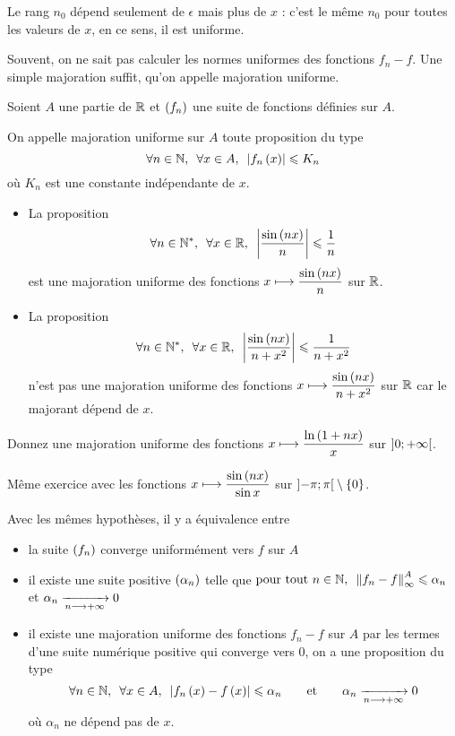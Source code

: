 Le rang \(n_0\) dépend seulement de \(\epsilon\) mais plus de \(x\) : c'est le même \(n_0\) pour toutes les valeurs de \(x\), en ce sens, il est uniforme.

Souvent, on ne sait pas calculer les normes uniformes des fonctions \(f_n-f\). Une simple majoration suffit, qu'on appelle majoration uniforme.

\begin{defi}
Soient \(A\) une partie de \(\mathbb{R}\) et \(\left(f_n\right)\) une suite de fonctions définies sur \(A\).

On appelle majoration uniforme sur \(A\) toute proposition du type \[\quantifs{\forall n\in\N;\forall x\in A}\abs{f_n\paren{x}}\leq K_n\] où \(K_n\) est une constante indépendante de \(x\).
\end{defi}

\begin{ex}
\begin{itemize}
    \item La proposition \[\quantifs{\forall n\in\Ns;\forall x\in\R}\abs{\dfrac{\sin\paren{nx}}{n}}\leq\dfrac{1}{n}\] est une majoration uniforme des fonctions \(x\longmapsto\dfrac{\sin\left(nx\right)}{n}\) sur \(\mathbb{R}\). \\
    \item La proposition \[\quantifs{\forall n\in\Ns;\forall x\in\R}\abs{\dfrac{\sin\paren{nx}}{n+x^2}}\leq\dfrac{1}{n+x^2}\] n'est pas une majoration uniforme des fonctions \(x\longmapsto\dfrac{\sin\left(nx\right)}{n+x^2}\) sur \(\mathbb{R}\) car le majorant dépend de \(x\).
\end{itemize}
\end{ex}

\begin{exo}
Donnez une majoration uniforme des fonctions \(x\longmapsto\dfrac{\ln\left(1+nx\right)}{x}\) sur \(\left]0;+\infty\right[\).
\end{exo}

\begin{exo}
Même exercice avec les fonctions \(x\longmapsto\dfrac{\sin\left(nx\right)}{\sin x}\) sur \(\left]-\pi;\pi\right[\setminus\left\lbrace0\right\rbrace\).
\end{exo}

\begin{prop}
Avec les mêmes hypothèses, il y a équivalence entre

\begin{itemize}
    \item la suite \(\left(f_n\right)\) converge uniformément vers \(f\) sur \(A\) \\
    \item il existe une suite positive \(\left(\alpha_n\right)\) telle que \(\quantifs{\tpt n\in\N}\norme{f_n-f}_\infty^A\leq\alpha_n\) et \(\alpha_n\xrightarrow[n\longrightarrow+\infty]{}0\) \\
    \item il existe une majoration uniforme des fonctions \(f_n-f\) sur \(A\) par les termes d'une suite numérique positive qui converge vers \(0\), \ie on a une proposition du type \[\quantifs{\forall n\in\N;\forall x\in A}\abs{f_n\paren{x}-f\paren{x}}\leq\alpha_n\qquad\text{et}\qquad\alpha_n\tendqd{n\to\pinf}0\] où \(\alpha_n\) ne dépend pas de \(x\).
\end{itemize}
\end{prop}

